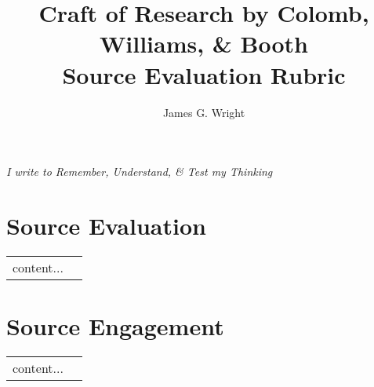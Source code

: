 \documentclass[10pt, a4paper]{article}
\begin{document}
	\title{Craft of Research by Colomb, Williams, \& Booth\cite{booth2009craft}
		\\Source Evaluation Rubric}
	\author{James G. Wright }
	\maketitle
	\begin{center}
		\emph{I write to Remember, Understand, \& Test my Thinking}
	\end{center}
	
	\newpage
\section{Source Evaluation}
\begin{center}
	\begin{tabular}{|l |l|}
		content...
	\end{tabular}
\end{center}

\section{Source Engagement}
\begin{center}
	\begin{tabular}{|l |l|}
		content...
	\end{tabular}
\end{center}


\end{document}
